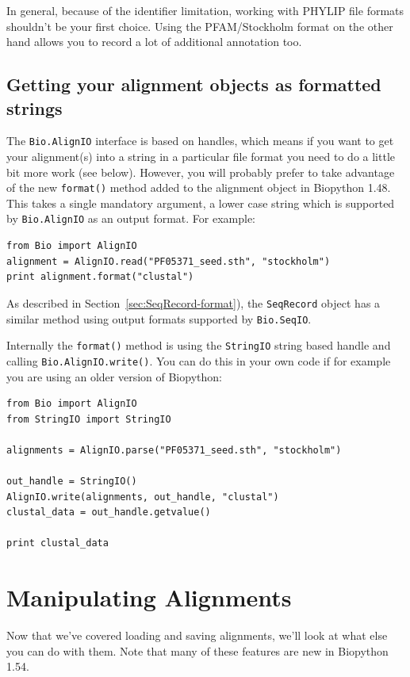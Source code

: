 \documentclass{report}
\begin{document}
\noindent In general, because of the identifier limitation, working with PHYLIP file formats shouldn't be your first choice.  Using the PFAM/Stockholm format on the other hand allows you to record a lot of additional annotation too.

\subsection{Getting your alignment objects as formatted strings}
\label{sec:alignment-format-method}
The \verb|Bio.AlignIO| interface is based on handles, which means if you want to get your alignment(s) into a string in a particular file format you need to do a little bit more work (see below).  
However, you will probably prefer to take advantage of the new \verb|format()| method added to the alignment object in Biopython 1.48.  This takes a single mandatory argument, a lower case string which is supported by \verb|Bio.AlignIO| as an output format.  For example:

\begin{verbatim}
from Bio import AlignIO
alignment = AlignIO.read("PF05371_seed.sth", "stockholm")
print alignment.format("clustal")
\end{verbatim}

As described in Section~\ref{sec:SeqRecord-format}), the \verb|SeqRecord| object has a similar method using output formats supported by \verb|Bio.SeqIO|.

Internally the \verb|format()| method is using the \verb|StringIO| string based handle and calling
\verb|Bio.AlignIO.write()|.  You can do this in your own code if for example you are using an
older version of Biopython:

\begin{verbatim}
from Bio import AlignIO
from StringIO import StringIO

alignments = AlignIO.parse("PF05371_seed.sth", "stockholm")

out_handle = StringIO()
AlignIO.write(alignments, out_handle, "clustal")
clustal_data = out_handle.getvalue()

print clustal_data
\end{verbatim}

\section{Manipulating Alignments}
\label{sec:manipulating-alignments}

Now that we've covered loading and saving alignments, we'll look at what else you can do
with them. Note that many of these features are new in Biopython 1.54.
\end{document}
